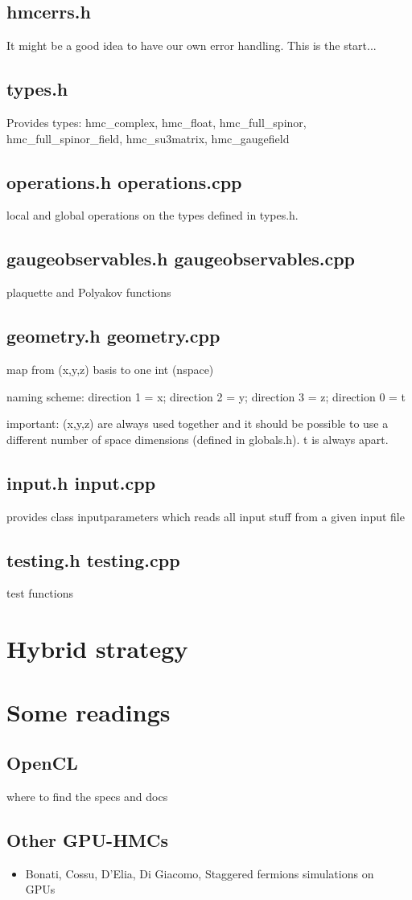 \documentclass[a4paper,11pt]{article}
\begin{document}
\subsection{hmcerrs.h}
It might be a good idea to have our own error handling. This is the start...
\subsection{types.h}
Provides types: hmc\_complex, hmc\_float, hmc\_full\_spinor, hmc\_full\_spinor\_field, hmc\_su3matrix, hmc\_gaugefield
\subsection{operations.h operations.cpp}
local and global operations on the types defined in types.h. 
\subsection{gaugeobservables.h gaugeobservables.cpp}
plaquette and Polyakov functions
\subsection{geometry.h geometry.cpp}
map from (x,y,z) basis to one int (nspace)

naming scheme: direction 1 = x; direction 2 = y; direction 3 = z; direction 0 = t

important: (x,y,z) are always used together and it should be possible to use a different number of space dimensions (defined in globals.h). t is always apart.

\subsection{input.h input.cpp}
provides class inputparameters which reads all input stuff from a given input file


\subsection{testing.h testing.cpp}
test functions


\section{Hybrid strategy}

\section{Some readings}
\subsection{OpenCL}
where to find the specs and docs
\subsection{Other GPU-HMCs}
\begin{itemize}
\item Bonati, Cossu, D'Elia, Di Giacomo, Staggered fermions simulations on GPUs~\cite{Bonati:2010qu}
\end{itemize}



\end{document}

